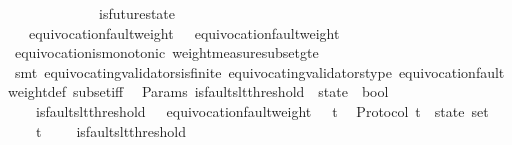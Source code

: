 \begin{isabellebody}
\ \ {\isachardoublequoteopen}{\isasymforall}\ {\isasymsigma}\ {\isasymsigma}{\isacharprime}{\isachardot}\ {\isasymsigma}\ {\isasymin}\ {\isasymSigma}\ {\isasymand}\ {\isasymsigma}{\isacharprime}\ {\isasymin}\ {\isasymSigma}\ {\isasymand}\ is{\isacharunderscore}future{\isacharunderscore}state\ {\isacharparenleft}{\isasymsigma}{\isacharcomma}\ {\isasymsigma}{\isacharprime}{\isacharparenright}\isanewline
\ \ {\isasymlongrightarrow}\ equivocation{\isacharunderscore}fault{\isacharunderscore}weight\ {\isasymsigma}\ {\isasymle}\ equivocation{\isacharunderscore}fault{\isacharunderscore}weight\ {\isasymsigma}{\isacharprime}{\isachardoublequoteclose}\isanewline
%
\isadelimproof
\ \ %
\endisadelimproof
%
\isatagproof
{}\isamarkupfalse%
\ equivocation{\isacharunderscore}is{\isacharunderscore}monotonic\ weight{\isacharunderscore}measure{\isacharunderscore}subset{\isacharunderscore}gte\ \isanewline
\ \ \isamarkupfalse%
\ {\isacharparenleft}smt\ equivocating{\isacharunderscore}validators{\isacharunderscore}is{\isacharunderscore}finite\ equivocating{\isacharunderscore}validators{\isacharunderscore}type\ equivocation{\isacharunderscore}fault{\isacharunderscore}weight{\isacharunderscore}def\ subset{\isacharunderscore}iff{\isacharparenright}%
\endisatagproof
{\isafoldproof}%
%
\isadelimproof
\isanewline
%
\endisadelimproof
\isanewline
\isanewline
{}\isamarkupfalse%
\ {\isacharparenleft}\ Params{\isacharparenright}\ is{\isacharunderscore}faults{\isacharunderscore}lt{\isacharunderscore}threshold\ {\isacharcolon}{\isacharcolon}\ {\isachardoublequoteopen}state\ {\isasymRightarrow}\ bool{\isachardoublequoteclose}\isanewline
\ \ \ \isanewline
\ \ \ \ {\isachardoublequoteopen}is{\isacharunderscore}faults{\isacharunderscore}lt{\isacharunderscore}threshold\ {\isasymsigma}\ {\isacharequal}\ {\isacharparenleft}equivocation{\isacharunderscore}fault{\isacharunderscore}weight\ {\isasymsigma}\ {\isacharless}\ t{\isacharparenright}{\isachardoublequoteclose}\isanewline
\isanewline
{}\isamarkupfalse%
\ {\isacharparenleft}\ Protocol{\isacharparenright}\ {\isasymSigma}t\ {\isacharcolon}{\isacharcolon}\ {\isachardoublequoteopen}state\ set{\isachardoublequoteclose}\isanewline
\ \ \isanewline
\ \ \ \ {\isachardoublequoteopen}{\isasymSigma}t\ {\isacharequal}\ {\isacharbraceleft}{\isasymsigma}\ {\isasymin}\ {\isasymSigma}{\isachardot}\ is{\isacharunderscore}faults{\isacharunderscore}lt{\isacharunderscore}threshold\ {\isasymsigma}{\isacharbraceright}{\isachardoublequoteclose}\ \isanewline

\end{isabellebody}
